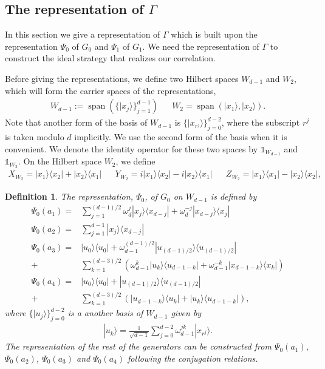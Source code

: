 \documentclass[11pt,letterpaper]{article}
\newcommand{\ket}[1]{|#1\rangle}
\newcommand{\ketbra}[2]{|#1\rangle\langle#2|}
\DeclareMathOperator{\spn}{span}
\newcommand{\1}{\mathbb{1}}
\newtheorem{definition}[theorem]{Definition}
\theoremstyle{definition}
\begin{document}
\subsection{The representation of $\Gamma$}
In this section we give a representation of $\Gamma$ which is built upon the representation 
$\Psi_0$ of $G_0$ and $\Psi_1$ of $G_1$. We need the representation of $\Gamma$ to construct the
ideal strategy that realizes our correlation.

Before giving the representations, we define two Hilbert spaces $W_{d-1}$ and $W_2$, which will form the carrier spaces
of the representations,
\begin{align}
	\label{eq:w_subspace}
	W_{d-1} := \spn(\{\ket{x_j}\}_{j=1}^{d-1}) && W_2 = \spn(\ket{x_1}, \ket{x_2}).
\end{align}
Note that another form of the basis of $W_{d-1}$ is $\{\ket{x_{r^j}}\}_{j=0}^{d-2}$, where the subscript $r^j$ is taken
modulo $d$ implicitly. We use the second form of the basis when it is convenient.
We denote the identity operator for these two spaces by $\1_{W_{d-1}}$ and $\1_{W_2}$.
On the Hilbert space $W_2$, we define
\begin{align}
	X_{W_2} = \ketbra{x_1}{x_2} + \ketbra{x_2}{x_1} &&
	Y_{W_2} = i\ketbra{x_1}{x_2} - i \ketbra{x_2}{x_1} &&
	Z_{W_2} = \ketbra{x_1}{x_1} - \ketbra{x_2}{x_2},
\end{align}
\begin{definition}
The representation, $\Psi_0$, of $G_0$ on $W_{d-1}$ is defined by
\begin{align}
	\Psi_0(a_1) =&\sum_{j=1}^{(d-1)/2} \omega_d^j \ketbra{x_j}{x_{d-j}} + \omega_d^{-j} \ketbra{x_{d-j}}{x_{j}} \\
	\Psi_0(a_2) = &\sum_{j=1}^{d-1} \ketbra{x_j}{x_{d-j}}\\
	\Psi_0(a_3) = &\ketbra{u_0}{u_0} +\omega_{d-1}^{(d-1)/2}\ketbra{u_{(d-1)/2}}{u_{(d-1)/2}}\\ + 
	&\sum_{k=1}^{(d-3)/2}\left( \omega_{d-1}^k\ketbra{u_k}{u_{d-1-k}} + \omega_{d-1}^{-k}\ketbra{x_{d-1-k}}{x_k}\right)\\ 
	\Psi_0(a_4) = &\ketbra{u_0}{u_0} +\ketbra{u_{(d-1)/2}}{u_{(d-1)/2}} \\+
	 &\sum_{k=1}^{(d-3)/2}\left(\ketbra{u_{d-1-k}}{u_k} + \ketbra{u_k}{u_{d-1-k}}\right),
\end{align}
where $\{ \ket{u_j} \}_{j=0}^{d-2}$ is a another basis of $W_{d-1}$ given by
\begin{align}
	\ket{u_k} = \frac{1}{\sqrt{d-1}} \sum_{j=0}^{d-2} \omega_{d-1}^{jk} \ket{x_{r^j}}.
\end{align}
The representation of the rest of the generators
can be constructed from $\Psi_0(a_1)$, $\Psi_0(a_2)$, $\Psi_0(a_3)$ and $\Psi_0(a_4)$ following the 
conjugation relations.
\end{definition}
\end{document}
